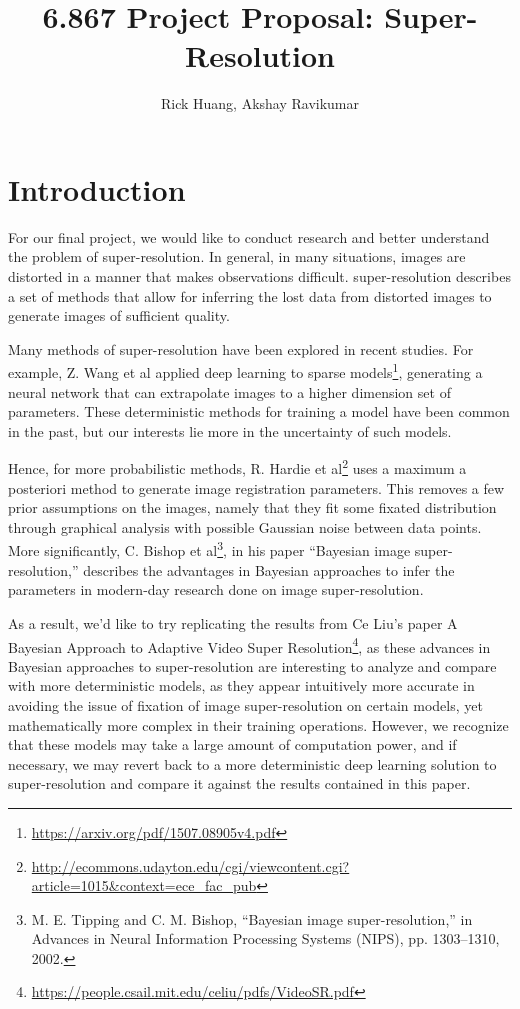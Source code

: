\documentclass[10pt]{paper}
\title{	
\vspace{-7ex}
6.867 Project Proposal: Super-Resolution \\ %
}
\author{
Rick Huang, Akshay Ravikumar
}
\numberwithin{equation}{section} %
\numberwithin{figure}{section} %
\numberwithin{table}{section} %
\begin{document}
\maketitle

\section{Introduction}

For our final project, we would like to conduct research and better understand the problem of super-resolution. In general, in many situations, images are distorted in a manner that makes observations difficult. super-resolution describes a set of methods that allow for inferring the lost data from distorted images to generate images of sufficient quality.

Many methods of super-resolution have been explored in recent studies. For example, Z. Wang et al applied deep learning to sparse models\footnote{\url{https://arxiv.org/pdf/1507.08905v4.pdf}}, generating a neural network that can extrapolate images to a higher dimension set of parameters. These deterministic methods for training a model have been common in the past, but our interests lie more in the uncertainty of such models.

Hence, for more probabilistic methods, R. Hardie et al\footnote{\url{http://ecommons.udayton.edu/cgi/viewcontent.cgi?article=1015&context=ece_fac_pub}} uses a maximum a posteriori method to generate image registration parameters. This removes a few prior assumptions on the images, namely that they fit some fixated distribution through graphical analysis with possible Gaussian noise between data points. More significantly, C. Bishop et al\footnote{M. E. Tipping and C. M. Bishop, ``Bayesian image super-resolution,'' in Advances
in Neural Information Processing Systems (NIPS), pp. 1303–1310,
2002.}, in his paper ``Bayesian image super-resolution,'' describes the advantages in Bayesian approaches to infer the parameters in modern-day research done on image super-resolution.

As a result, we'd like to try replicating the results from Ce Liu's paper A Bayesian Approach to Adaptive Video Super Resolution\footnote{\url{https://people.csail.mit.edu/celiu/pdfs/VideoSR.pdf}}, as these advances in Bayesian approaches to super-resolution are interesting to analyze and compare with more deterministic models, as they appear intuitively more accurate in avoiding the issue of fixation of image super-resolution on certain models, yet mathematically more complex in their training operations. However, we recognize that these models may take a large amount of computation power, and if necessary, we may revert back to a more deterministic deep learning solution to super-resolution and compare it against the results contained in this paper.
\end{document}
